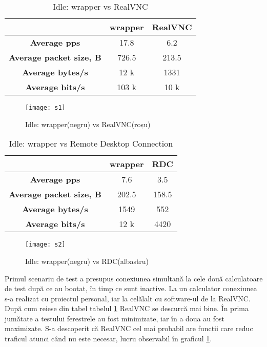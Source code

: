 \begin{table}[t]
\centering
\begin{tabular}{|c|c|c|}
\hline
                                &  wrapper 		 & RealVNC \\ \hline
\textbf{Average pps}            & 17.8           & 6.2     \\ \hline
\textbf{Average packet size, B} & 726.5          & 213.5   \\ \hline
\textbf{Average bytes/s}        & 12 k           & 1331    \\ \hline
\textbf{Average bits/s}         & 103 k          & 10 k    \\ \hline
\end{tabular}
\caption{Idle: wrapper vs RealVNC}
\label{table:s1}
\end{table}
\begin{figure}
    \centering
    \texttt{[image: s1]}
    \caption{Idle: wrapper(negru) vs RealVNC(roșu)}
    \label{fig:s1}
\end{figure}
\begin{table}[t]
\centering
\begin{tabular}{|c|c|c|}
\hline
                                & wrapper & RDC 	\\ \hline
\textbf{Average pps}            & 7.6	  & 3.5     \\ \hline
\textbf{Average packet size, B} & 202.5   & 158.5	\\ \hline
\textbf{Average bytes/s}        & 1549    & 552     \\ \hline
\textbf{Average bits/s}         & 12 k    & 4420	\\ \hline
\end{tabular}
\caption{Idle: wrapper vs Remote Desktop Connection}
\label{table:s2}
\end{table}
\begin{figure}
    \centering
    \texttt{[image: s2]}
    \caption{Idle: wrapper(negru) vs RDC(albastru)}
    \label{fig:s2}
\end{figure}

Primul scenariu de test a presupus conexiunea simultană la cele două calculatoare de test după ce au bootat, în timp ce sunt inactive. La un calculator conexiunea s-a realizat cu proiectul personal, iar la celălalt cu software-ul de la RealVNC. După cum reiese din tabel tabelul \ref{table:s1} RealVNC se descurcă mai bine. În prima jumătate a testului ferestrele au fost minimizate, iar în a doua au fost maximizate. S-a descoperit că RealVNC cel mai probabil are funcții care reduc traficul atunci când nu este necesar, lucru observabil în graficul \ref{fig:s1}. 

